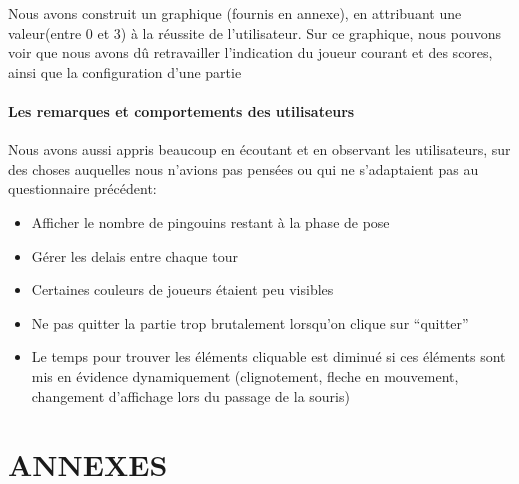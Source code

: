 \documentclass{report}
\begin{document}
Nous avons construit un graphique (fournis en annexe), en attribuant une valeur(entre 0 et 3) à la réussite de l'utilisateur. Sur ce graphique, nous pouvons voir que nous avons dû retravailler l'indication du joueur courant et des scores, ainsi que la configuration d'une partie

\subsection{Les remarques et comportements des utilisateurs}
Nous avons aussi appris beaucoup en écoutant et en observant les utilisateurs, sur des choses auquelles nous n'avions pas pensées ou qui ne s'adaptaient pas au questionnaire précédent:
\begin{itemize}
\item Afficher le nombre de pingouins restant à la phase de pose
\item Gérer les delais entre chaque tour
\item Certaines couleurs de joueurs étaient peu visibles
\item Ne pas quitter la partie trop brutalement lorsqu'on clique sur ``quitter''
\item Le temps pour trouver les éléments cliquable est diminué si ces éléments sont mis en évidence dynamiquement (clignotement, fleche en mouvement, changement d'affichage lors du passage de la souris)
\end{itemize}


\part*{ANNEXES}
\end{document}
